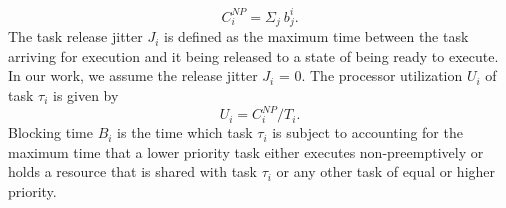 \begin{equation}\label{eqn:c-np2}
    C_{i}^{NP} = \Sigma_{j}\ b_{j}^{i}.
\end{equation}
\noindent
The task release jitter \begin{math}J_{i}\end{math} is defined as the maximum time between the task arriving for execution and it being released to a state of being ready to execute.  In our work, we assume the release jitter \begin{math}J_{i}\end{math} = 0.  The processor utilization \begin{math}U_{i}\end{math} of task \begin{math}\tau_{i}\end{math} is given by
\begin{equation}\label{eqn:u-task}
    U_{i} = C_{i}^{NP}/T_{i}.
\end{equation}
\noindent
Blocking time \begin{math}B_{i}\end{math} is the time which task \begin{math}\tau_{i}\end{math} is subject to accounting for the maximum time that a lower priority task either executes non-preemptively or holds a resource that is shared with task \begin{math}\tau_{i}\end{math} or any other task of equal or higher priority.  

